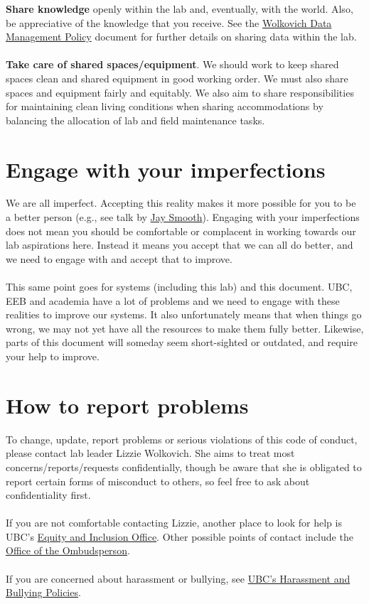 \documentclass[11pt,a4paper,oneside]{article}
\begin{document}
\textbf{Share knowledge} openly within the lab and, eventually, with the world. Also, be appreciative of the knowledge that you receive. See the \href{https://github.com/temporalecologylab/labgit/blob/master/datacodemgmt/tempeco_DMP.pdf}{Wolkovich Data Management Policy} document for further details on sharing data within the lab.\\
\\
\noindent
\textbf{Take care of shared spaces/equipment}. We should work to keep shared spaces clean and shared equipment in good working order. We must also share spaces and equipment fairly and equitably. We also aim to share responsibilities for maintaining clean living conditions when sharing accommodations by balancing the allocation of lab and field maintenance tasks.

\section{Engage with your imperfections}

We are all imperfect. Accepting this reality makes it more possible for you to be a better person (e.g., see talk by \href{https://www.youtube.com/watch?v=MbdxeFcQtaU}{Jay Smooth}). Engaging with your imperfections does not mean you should be comfortable or complacent in working towards our lab aspirations here. Instead it means you accept that we can all do better, and we need to engage with and accept that to improve. \\
\\
\noindent
This same point goes for systems (including this lab) and this document. UBC, EEB and academia have a lot of problems and we need to engage with these realities to improve our systems. It also unfortunately means that when things go wrong, we may not yet have all the resources to make them fully better. Likewise, parts of this document will someday seem short-sighted or outdated, and require your help to improve.

\section*{How to report problems}

To change, update, report problems or serious violations of this code of conduct, please contact lab leader Lizzie Wolkovich. She aims to treat most concerns/reports/requests  confidentially, though be aware that she is obligated to report certain forms of misconduct to others, so feel free to ask about confidentiality first. \\
\\
\noindent
If you are not comfortable contacting Lizzie, another place to look for help is UBC’s \href{https://equity.ubc.ca/how-we-can-help/}{Equity and Inclusion Office}. Other possible points of contact include the \href{https://ombudsoffice.ubc.ca/}{Office of the Ombudsperson}.\\
\\
\noindent
If you are concerned about harassment or bullying, see \href{https://bullyingandharassment.ubc.ca/resources/}{UBC’s Harassment and Bullying Policies}.
\end{document}
